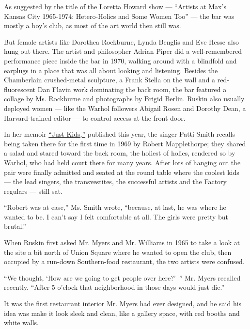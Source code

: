 As suggested by the title of the Loretta Howard show --- ``Artists at
Max's Kansas City 1965-1974: Hetero-Holics and Some Women Too'' --- the
bar was mostly a boy's club, as most of the art world then still was.

But female artists like Dorothea Rockburne, Lynda Benglis and Eve Hesse
also hung out there. The artist and philosopher Adrian Piper did a
well-remembered performance piece inside the bar in 1970, walking around
with a blindfold and earplugs in a place that was all about looking and
listening. Besides the Chamberlain crushed-metal sculpture, a Frank
Stella on the wall and a red-fluorescent Dan Flavin work dominating the
back room, the bar featured a collage by Ms. Rockburne and photographs
by Brigid Berlin. Ruskin also usually deployed women --- like the Warhol
followers Abigail Rosen and Dorothy Dean, a Harvard-trained editor ---
to control access at the front door.

In her memoir
\href{http://www.nytimes3xbfgragh.onion/2010/01/31/books/review/Carson-t.html?_r=1\&ref=patti_smith}{``Just
Kids,''} published this year, the singer Patti Smith recalls being taken
there for the first time in 1969 by Robert Mapplethorpe; they shared a
salad and stared toward the back room, the holiest of holies, rendered
so by Warhol, who had held court there for many years. After lots of
hanging out the pair were finally admitted and seated at the round table
where the coolest kids --- the lead singers, the transvestites, the
successful artists and the Factory regulars --- still sat.

``Robert was at ease,'' Ms. Smith wrote, ``because, at last, he was
where he wanted to be. I can't say I felt comfortable at all. The girls
were pretty but brutal.''

When Ruskin first asked Mr. Myers and Mr. Williams in 1965 to take a
look at the site a bit north of Union Square where he wanted to open the
club, then occupied by a run-down Southern-food restaurant, the two
artists were confused.

``We thought, `How are we going to get people over here?'~'' Mr. Myers
recalled recently. ``After 5 o'clock that neighborhood in those days
would just die.''

It was the first restaurant interior Mr. Myers had ever designed, and he
said his idea was make it look sleek and clean, like a gallery space,
with red booths and white walls.

\href{https://www.nytimes3xbfgragh.onion/slideshow/2010/09/01/arts/design/20100905-MAXS.html}{}

